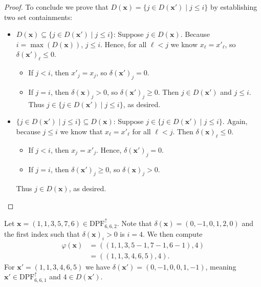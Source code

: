 \documentclass[11pt,reqno]{BICA}
\theoremstyle{definition}
\newcommand{\NDDPF}{\mathrm{DPF}^\uparrow}
\newcommand{\x}{\mathbf{x}}
\begin{document}
\begin{proof}
To conclude we prove that $D(\x) = \{j \in D(\x') \mid j \leq i\}$ by establishing two set containments:
    \begin{itemize}[leftmargin=.2in]
        \item $D(\x) \subseteq \{j \in D(\x') \mid j \leq i\}$:  Suppose $j \in D(\x)$. Because $i = \max(D(\x))$, $j \leq i$. Hence, for all $\ell < j$ we know $x_\ell = x'_\ell$, so $\delta(\x')_\ell \leq 0$. \begin{itemize}
            \item If $j < i$, then $x'_j = x_j$, so $\delta(\x')_j = 0$. 
            \item If $j = i$, then $\delta(\x)_j > 0$, so $\delta(\x')_j \geq 0$. Then $j \in D(\x')$ and $j \leq i$. Thus $j \in \{j \in D(\x') \mid j \leq i\}$, as desired.
        \end{itemize}
        \item $\{j \in D(\x') \mid j \leq i\}\subseteq D(\x) $: Suppose $j \in \{j \in D(\x') \mid j \leq i\}$. Again, because $j \leq i$ we know that $x_\ell = x'_\ell$ for all $\ell < j$. Then $\delta(\x)_\ell \leq 0$. 
        \begin{itemize}
            \item If $j < i$, then $x_j = x'_j$. Hence, $\delta(\x')_j = 0$.
            \item If $j = i$, then $\delta(\x')_j \geq 0$, so $\delta(\x)_j > 0$.
        \end{itemize}  Thus $j \in D(\x)$, as desired.\qedhere
    \end{itemize}
\end{proof}

\begin{example}
    Let $\x=(1,1,3,5,7,6)\in\NDDPF_{6,6,2}$. Note that $\delta(\x)=(0,-1,0,1,2,0)$ and the first index such that $\delta(\x)_i>0$ is $i=4$. We then compute \begin{align*}
        \varphi(\x)&=((1,1,3,5-1,7-1,6-1),4)\\
        &=((1,1,3,4,6,5),4).
    \end{align*}
    For $\x'=(1,1,3,4,6,5)$ we have  $\delta(\x')=(0,-1,0,0,1,-1)$, meaning $\x'\in\NDDPF_{6,6,1}$ and $4\in D(\x')$.
\end{example}
\end{document}
